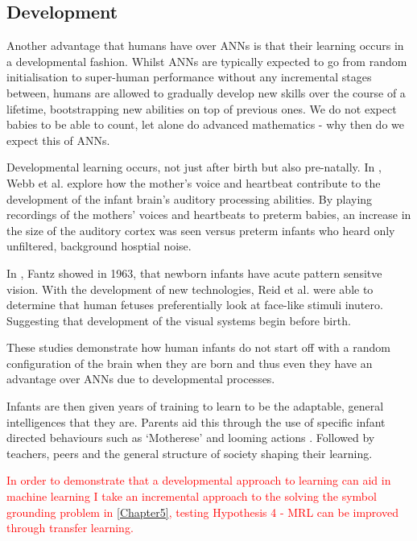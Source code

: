 \subsection{Development}
Another advantage that humans have over \acp{ANN} is that their learning occurs in a developmental fashion. Whilst \acp{ANN} are typically expected to go from random initialisation to super-human performance without any incremental stages between, humans are allowed to gradually develop new skills over the course of a lifetime, bootstrapping new abilities on top of previous ones. We do not expect babies to be able to count, let alone do advanced mathematics - why then do we expect this of \acp{ANN}.

Developmental learning occurs, not just after birth but also pre-natally. In \cite{webb2015mother}, Webb et al. explore how the mother's voice and heartbeat contribute to the development of the infant brain's auditory processing abilities. By playing recordings of the mothers' voices and heartbeats to preterm babies, an increase in the size of the auditory cortex was seen versus preterm infants who heard only unfiltered, background hosptial noise.


In \cite{fantz1963pattern}, Fantz showed in 1963, that newborn infants have acute pattern sensitve vision. With the development of new technologies, Reid et al. \cite{reid2017human} were able to determine that human fetuses preferentially look at face-like stimuli inutero. Suggesting that development of the visual systems begin before birth.

These studies demonstrate how human infants do not start off with a random configuration of the brain when they are born and thus even they have an advantage over \acp{ANN} due to developmental processes.

Infants are then given years of training to learn to be the adaptable, general intelligences that they are. Parents aid this through the use of specific infant directed behaviours such as `Motherese' \cite{fernald1987acoustic} and looming actions \cite{lohan2012contingency, lohan2012tutor}. Followed by teachers, peers and the general structure of society shaping their learning.

\textcolor{red}{In order to demonstrate that a developmental approach to learning can aid in machine learning I take an incremental approach to the solving the symbol grounding problem in \autoref{Chapter5}, testing Hypothesis 4 - \ac{MRL} can be improved through transfer learning.} 

